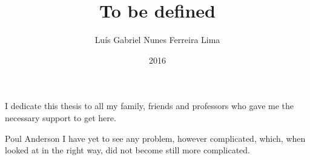 \documentclass[en,twoside,onehalfspacing,msc]{risethesis}
\title{To be defined}
\date{2016}
\author{Luís Gabriel Nunes Ferreira Lima}
\begin{document}
\frontmatter

\frontpage

\presentationpage

\begin{fichacatalografica}
	\FakeFichaCatalografica %
\end{fichacatalografica}

\banca

\begin{dedicatory}
I dedicate this thesis to all my family, friends and professors who gave me the
necessary support to get here.
\end{dedicatory}

\acknowledgements


\begin{epigraph}[]{Poul Anderson}
I have yet to see any problem, however complicated, which, when looked at in the
right way, did not become still more complicated.
\end{epigraph}

\resumo


\abstract


\listoffigures

\listoftables

\listofacronyms


\tableofcontents

\mainmatter









\begin{references}
  
\end{references}

\theappendix

\end{document}
